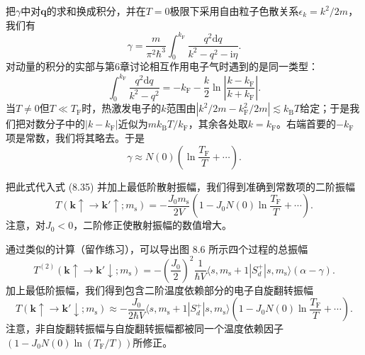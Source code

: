 把$\gamma$中对$\mathbf{q}$的求和换成积分，并在$T=0$极限下采用自由粒子色散关系$\epsilon_k=k^2/2m$，我们有
\begin{equation*}
\gamma = \frac{m}{\pi^2\hbar^3}\int_0^{k_{\mathrm{F}}}\frac{q^2\mathrm{d}q}{k^2-q^2-\mathrm{i}\eta}.
\tag{8.36}
\end{equation*}
对动量的积分的实部与第6章讨论相互作用电子气时遇到的是同一类型：
\begin{equation*}
\int_0^{k_{\mathrm{F}}}\frac{q^2\mathrm{d}q}{k^2-q^2} = -k_{\mathrm{F}}-\frac{k}{2}\ln\left|\frac{k-k_{\mathrm{F}}}{k+k_{\mathrm{F}}}\right|.
\tag{8.37}
\end{equation*}
当$T\neq 0$但$T\ll T_{\mathrm{F}}$时，热激发电子的$k$范围由$|k^2/2m-k_{\mathrm{F}}^2/2m|\lesssim k_{\mathrm{B}}T$给定；于是我们把对数分子中的$|k-k_{\mathrm{F}}|$近似为$mk_{\mathrm{B}}T/k_{\mathrm{F}}$，其余各处取$k=k_{\mathrm{F}}$。右端首要的$-k_{\mathrm{F}}$项是常数，我们将其略去。于是
\begin{equation*}
\gamma \approx N(0)\left(\ln\frac{T_{\mathrm{F}}}{T}+\cdots\right).
\tag{8.38}
\end{equation*}

把此式代入式 (8.35) 并加上最低阶散射振幅，我们得到准确到常数项的二阶振幅
\begin{equation*}
T(\mathbf{k}\uparrow\to\mathbf{k}'\uparrow;m_{\mathrm{s}}) = -\frac{J_0 m_{\mathrm{s}}}{2V}\left(1-J_0N(0)\ln\frac{T_{\mathrm{F}}}{T}+\cdots\right).
\tag{8.39}
\end{equation*}
注意，对$J_0<0$，二阶修正使散射振幅的数值增大。

通过类似的计算（留作练习），可以导出图 8.6 所示四个过程的总振幅
\begin{equation*}
T^{(2)}(\mathbf{k}\uparrow\to\mathbf{k}'\downarrow;m_{\mathrm{s}}) = -\left(\frac{J_0}{2}\right)^2\frac{1}{\hbar V}\langle s,m_{\mathrm{s}}+1|S_d^{+}|s,m_{\mathrm{s}}\rangle(\alpha-\gamma).
\tag{8.40}
\end{equation*}
加上最低阶振幅，我们得到包含二阶温度依赖部分的电子自旋翻转振幅
\begin{equation*}
T(\mathbf{k}\uparrow\to\mathbf{k}'\downarrow;m_{\mathrm{s}}) \approx -\frac{J_0}{2\hbar V}\langle s,m_{\mathrm{s}}+1|S_d^{+}|s,m_{\mathrm{s}}\rangle\left(1-J_0N(0)\ln\frac{T_{\mathrm{F}}}{T}+\cdots\right).
\tag{8.41}
\end{equation*}
注意，非自旋翻转振幅与自旋翻转振幅都被同一个温度依赖因子$(1-J_0N(0)\ln(T_{\mathrm{F}}/T))$所修正。


